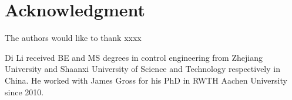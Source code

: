 \documentclass[10pt,journal,compsoc]{IEEEtran}
\theoremstyle{mytheoremstyle}
\theoremstyle{mytheoremstyle}
\theoremstyle{mytheoremstyle}
\begin{document}
\section*{Acknowledgment}

The authors would like to thank xxxx


\ifCLASSOPTIONcaptionsoff
  \newpage
\fi





%
%
%


% 

\begin{IEEEbiographynophoto}{Di Li}
received BE and MS degrees in control engineering from Zhejiang University and Shaanxi University of Science and Technology respectively in China.
He worked with James Gross for his PhD in RWTH Aachen University since 2010.
\end{IEEEbiographynophoto}
\end{document}
